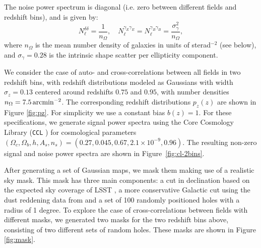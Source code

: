 \documentclass[a4paper,11pt]{article}
\begin{document}
      The noise power spectrum is diagonal (i.e. zero between different fields and redshift bins), and is given by:
      \begin{equation}
        N_\ell^{\delta\delta} = \frac{1}{n_\Omega},\hspace{12pt}
        N_\ell^{\gamma_E\gamma_E} = N_\ell^{\gamma_B\gamma_B} = \frac{\sigma_\gamma^2}{n_\Omega},
      \end{equation}
      where $n_\Omega$ is the mean number density of galaxies in units of sterad$^{-2}$ (see below), and $\sigma_\gamma=0.28$ is the intrinsic shape scatter per ellipticity component.

      We consider the case of auto- and cross-correlations between all fields in two redshift bins, with redshift distributions modeled as Gaussians with width $\sigma_z=0.13$ centered around redshifts $0.75$ and $0.95$, with number densities $n_\Omega=7.5\,{\rm arcmin}^{-2}$. The corresponding redshift distributions $p_z(z)$ are shown in Figure \ref{fig:pz}. For simplicity we use a constant bias $b(z)=1$. For these specifications, we generate signal power spectra using the Core Cosmology Library ({\tt CCL} \cite{2019ApJS..242....2C}) for cosmological parameters $(\Omega_c,\Omega_b,h,A_s,n_s)=(0.27,0.045,0.67,2.1\times10^{-9},0.96)$. The resulting non-zero signal and noise power spectra are shown in Figure~\ref{fig:cl-2bins}.

      After generating a set of Gaussian maps, we mask them making use of a realistic sky mask. This mask has three main components: a cut in declination based on the expected sky coverage of LSST \cite{2014SPIE.9150E..15D}, a more conservative Galactic cut using the dust reddening data from \cite{1998ApJ...500..525S} and a set of 100 randomly positioned holes with a radius of 1 degree. To explore the case of cross-correlations between fields with different masks, we generated two masks for the two redshift bins above, consisting of two different sets of random holes. These masks are shown in Figure \ref{fig:mask}.
\end{document}
